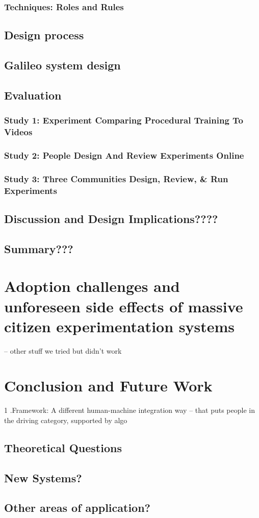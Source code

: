 \subsection{Techniques: Roles and Rules}

\section{Design process}

\section{Galileo system design}

\section{Evaluation}
\subsection{Study 1: Experiment Comparing Procedural Training To Videos}
\subsection{Study 2: People Design And Review Experiments Online}
\subsection{Study 3: Three Communities Design, Review, \& Run Experiments}

\section{Discussion and Design Implications????}
\section{Summary???}



\chapter{Adoption challenges and unforeseen side effects of massive citizen experimentation systems}
-- other stuff we tried but didn’t work

\chapter{Conclusion and Future Work}
1 .Framework: A different human-machine integration way 
--  that puts people in the driving category, supported by algo


\section{Theoretical Questions}

\section{New Systems?}

\section{Other areas of application?}